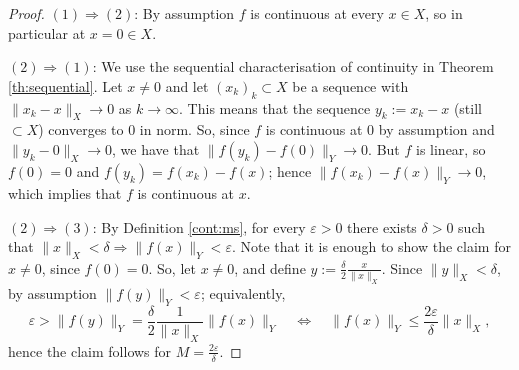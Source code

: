 \begin{proof}
$(1)\Rightarrow (2)$: By assumption $f$ is continuous at every $x\in X$, so in particular at $x=0\in X$.

\smallskip
$(2)\Rightarrow (1)$: We use the sequential characterisation of continuity in Theorem \ref{th:sequential}. Let $x\neq 0$ and let $(x_k)_k\subset X$ be a sequence with 
$\|x_k-x\|_X \to 0$ as $k\to \infty$. This means that the sequence $y_k:= x_k-x$ (still $\subset X$) converges to $0$ in norm. So, since $f$ is continuous at $0$ by assumption and 
$\|y_k-0\|_X\to 0$, we have that $\|f(y_k)-f(0)\|_Y\to 0$. But $f$ is linear, so $f(0)=0$ and $f(y_k) = f(x_k)-f(x)$; hence $\|f(x_k)-f(x)\|_Y\to 0$, which implies that $f$ is continuous at $x$.

\bis

$(2)\Rightarrow (3)$: By Definition \ref{cont:ms}, for every $\varepsilon>0$ there exists $\delta>0$ such that $\|x\|_X<\delta \Rightarrow \|f(x)\|_Y<\varepsilon$. 
Note that it is enough to show the claim for $x\neq 0$, since $f(0)=0$. So, let $x\neq 0$, and define $y:=\frac\delta2 \frac{x}{\|x\|_X}$. Since $\|y\|_X<\delta$, by assumption 
$\|f(y)\|_Y<\varepsilon$; equivalently,
$$
\varepsilon > \|f(y)\|_Y = \frac\delta2 \frac{1}{\|x\|_X}\|f(x)\|_Y \quad  \Leftrightarrow \quad \|f(x)\|_Y \leq \frac{2\varepsilon}{\delta} \|x\|_X,
$$
hence the claim follows for $M=\frac{2\varepsilon}{\delta}$.



\end{proof}
